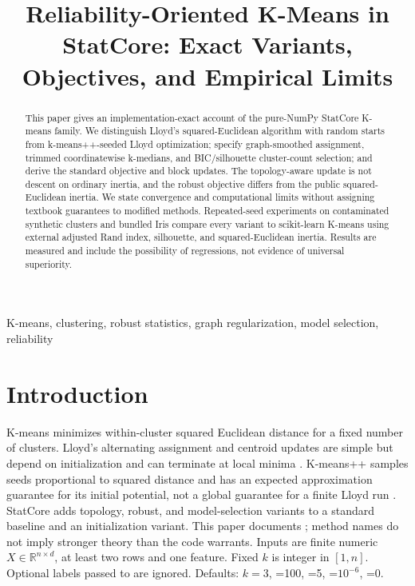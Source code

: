 \documentclass[conference]{IEEEtran}
\title{Reliability-Oriented K-Means in StatCore: Exact Variants, Objectives, and Empirical Limits}
\author{\jabulaniauthor
\and
\martinchanzauthor
\and
\oloratoauthor
\and
\mfundoauthor}
\begin{document}
\maketitle
\begin{abstract}
This paper gives an implementation-exact account of the pure-NumPy StatCore K-means family. We distinguish Lloyd's squared-Euclidean algorithm with random starts from k-means++-seeded Lloyd optimization; specify graph-smoothed assignment, trimmed coordinatewise k-medians, and BIC/silhouette cluster-count selection; and derive the standard objective and block updates. The topology-aware update is not descent on ordinary inertia, and the robust objective differs from the public squared-Euclidean inertia. We state convergence and computational limits without assigning textbook guarantees to modified methods. Repeated-seed experiments on contaminated synthetic clusters and bundled Iris compare every variant to scikit-learn K-means using external adjusted Rand index, silhouette, and squared-Euclidean inertia. Results are measured and include the possibility of regressions, not evidence of universal superiority.
\end{abstract}
\begin{IEEEkeywords}
K-means, clustering, robust statistics, graph regularization, model selection, reliability
\end{IEEEkeywords}
\section{Introduction}
K-means minimizes within-cluster squared Euclidean distance for a fixed number of clusters. Lloyd's alternating assignment and centroid updates are simple but depend on initialization and can terminate at local minima \cite{lloyd1982,macqueen1967}. K-means++ samples seeds proportional to squared distance and has an expected approximation guarantee for its initial potential, not a global guarantee for a finite Lloyd run \cite{arthurvassilvitskii2007}. StatCore adds topology, robust, and model-selection variants to a standard baseline and an initialization variant. This paper documents ; method names do not imply stronger theory than the code warrants.
Inputs are finite numeric \(X\in\mathbb R^{n\times d}\), at least two rows and one feature. Fixed \(k\) is integer in \([1,n]\). Optional labels passed to  are ignored. Defaults: \(k=3\), =100, =5, =$10^{-6}$, =0.
\end{document}
